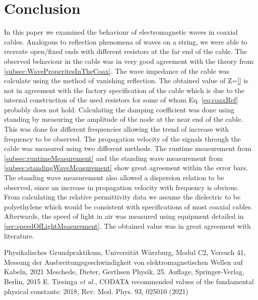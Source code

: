 \documentclass[a4paper,10pt,twocolumn]{article}
\begin{document}
    \section{Conclusion}\label{sec:Conclusion}
    In this paper we examined the behaviour of electromagnetic waves in coaxial cables.
    Analogous to reflection phenomena of waves on a string, we were able to recreate open/fixed ends with different resistors at the far end of the cable.
    The observed behaviour in the cable was in very good agreement with the theory from \ref{subsec:WaveProperitesInTheCoax}.
    The wave impedance of the cable was calculate using the method of vanishing reflection.
    The obtained value of Z=\ref{} is not in agreement with the factory specification of the cable which is due to the internal construction of the used resistors for some of whom Eq. \ref{eq:coaxRef} probably does not hold.
    Calculating the damping coefficient was done using standing by measuring the amplitude of the node at the near end of the cable.
    This was done for different frequencies allowing the trend of increase with frequency to be observed.
    The propagation velocity of the signals through the cable was measured using two different methods. 
    The runtime measurement from \ref{subsec:runtimeMeasurement} and the standing wave measurement from \ref{subsec:standingWaveMeasurement} show great agreement within the error bars.
    The standing wave measurement also allowed a dispersion relation to be observed, since an increase in propagation velocity with frequency is obvious.
    From calculating the relative permittivity data we assume the dielectric to be polyethylene which would be consistent with specifications of most coaxial cables.
    Afterwards, the speed of light in air was measured using equipment detailed in \ref{sec:speedOfLightMeasurement}.
    The obtained value was in great agreement with literature.
    \begin{thebibliography}{}    %
         Physikalisches Grundpraktikum, Universität Würzburg, Modul C2, Versuch 41, \grqq Messung der Ausbreitungsgeschwindigkeit
        von elektromagnetischen Wellen auf Kabeln\grqq, 2021
         Meschede, Dieter, Gerthsen Physik, 25. Auflage, Springer-Verlag, Berlin, 2015
         E. Tiesinga \textit{et al.}, \grqq CODATA
        recommended values of the fundamental physical constants: 2018\grqq, Rev. Mod. Phys. 93, 025010 (2021)
        
    \end{thebibliography}
    \newpage
\end{document}
